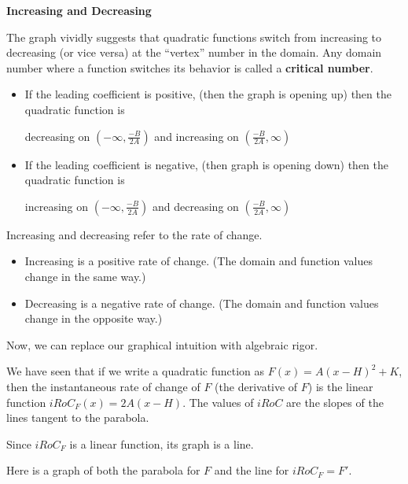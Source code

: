 \documentclass{ximera}
\begin{document}
\textbf{\textcolor{blue!55!black}{Increasing and Decreasing}}






The graph vividly suggests that quadratic functions switch from increasing to decreasing (or vice versa) at the ``vertex'' number in the domain. Any domain number where a function switches its behavior is called a \textbf{\textcolor{blue!55!black}{critical number}}.


\begin{itemize}
\item If the leading coefficient is positive, (then the graph is opening up) then the quadratic function is 

decreasing on $\left( -\infty, \frac{-B}{2A} \right)$ and increasing on $\left( \frac{-B}{2A}, \infty \right)$

\item If the leading coefficient is negative, (then graph is opening down) then the quadratic function is 

increasing on $\left( -\infty, \frac{-B}{2A} \right)$ and decreasing on $\left( \frac{-B}{2A}, \infty \right)$
\end{itemize}





Increasing and decreasing refer to the rate of change.


\begin{itemize}
\item Increasing is a positive rate of change. (The domain and function values change in the same way.)
\item Decreasing is a negative rate of change. (The domain and function values change in the opposite way.)
\end{itemize}



Now, we can replace our graphical intuition with algebraic rigor. 

We have seen that if we write a quadratic function as $F(x) = A (x - H)^2 + K$, then the instantaneous rate of change of $F$ (the derivative of $F$) is the linear function $iRoC_F(x) = 2 A (x - H)$. The values of $iRoC$ are the slopes of the lines tangent to the parabola.


Since $iRoC_F$ is a linear function, its graph is a line.


Here is a graph of both the parabola for $F$ and the line for $iRoC_F = F'$.
\end{document}

